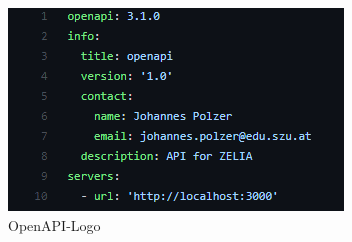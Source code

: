 
\begin{figure}[H]
    \centering
    \includegraphics{media/OpenAPI/header.png}
    \caption{OpenAPI-Logo  \cite{RestSoap}}
\end{figure}